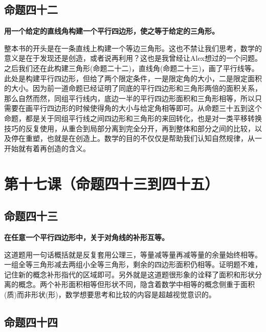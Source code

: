 \documentclass[
]{book}
\begin{document}
\hypertarget{ux547dux9898ux56dbux5341ux4e8c}{%
\section{命题四十二}\label{ux547dux9898ux56dbux5341ux4e8c}}

\textbf{用一个给定的直线角构建一个平行四边形，使之等于给定的三角形。}

整本书的开头是在一条直线上构建一个等边三角形。这也不禁让我们思考，数学的意义是在于发现还是创造，或者说再利用？这也是我曾经让Alex想过的一个问题。之后我们还在此构建三角形(命题二十二)，直线角(命题二十三)，画了平行线等。此处是构建平行四边形，但给了两个限定条件，一是限定角的大小，二是限定面积的大小。因为前一道命题已经证明了同底的平行四边形和三角形两倍的面积关系，那么自然而然，同组平行线内，底边一半的平行四边形面积和三角形相等，所以只需要在画平行四边形的时候使得角的大小与给定角相等即可。从命题三十五到这个命题，都是关于同组平行线之间四边形和三角形的来回转化，也是对一类平移转换技巧的反复使用，从重合到局部分离到完全分开，再到整体和部分之间的比较，以及停在重塑，也就是在创造上。数学的目的不仅仅是帮助我们认知自然规律，从一开始就有着再创造的含义。

\hypertarget{ux7b2cux5341ux4e03ux8bfeux547dux9898ux56dbux5341ux4e09ux5230ux56dbux5341ux4e94}{%
\chapter{第十七课（命题四十三到四十五）}\label{ux7b2cux5341ux4e03ux8bfeux547dux9898ux56dbux5341ux4e09ux5230ux56dbux5341ux4e94}}

\hypertarget{ux547dux9898ux56dbux5341ux4e09}{%
\section{命题四十三}\label{ux547dux9898ux56dbux5341ux4e09}}

\textbf{在任意一个平行四边形中，关于对角线的补形互等。}

这道题用一句话概括就是反复套用公理三，等量减等量再减等量的余量始终相等。一组全等三角形减去两组小全等三角形，剩余的四边形面积仍相等。证明题不难，记住新的概念补形指代的区域即可。另外就是这道题很形象的诠释了面积和形状分离的概念。两个补形面积相等但形状不同，隐含着数学中相等的概念侧重于面积(质)而非形状(形)，数学想要思考和比较的内容是超越视觉意识的。

\hypertarget{ux547dux9898ux56dbux5341ux56db}{%
\section{命题四十四}\label{ux547dux9898ux56dbux5341ux56db}}
\end{document}

